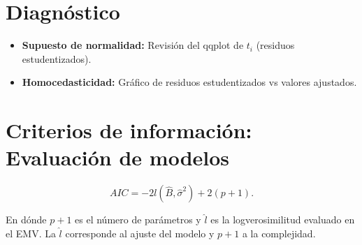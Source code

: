 \documentclass{article}
\begin{document}
\section{Diagnóstico}
\begin{itemize}
	\item \textbf{Supuesto de normalidad: } Revisión del qqplot de $t_{i}$ (residuos estudentizados).
	\item \textbf{Homocedasticidad: }Gráfico de residuos estudentizados vs valores ajustados.
\end{itemize}

\section{Criterios de información: Evaluación de modelos}
\[ AIC=-2l{(\hat{B},\hat{\sigma}^{2})}+2(p+1).\]

En dónde $p+1$ es el número de parámetros y $\hat{l}$ es la logverosimilitud evaluado en el EMV. La $\hat{l}$ corresponde al ajuste del modelo y $p+1$ a la complejidad.
\end{document}

